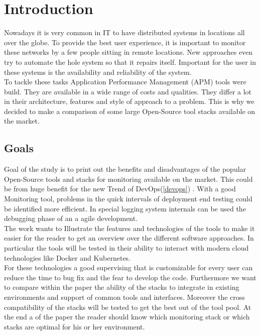 
\chapter{Introduction}
Nowadays it is very common in IT to have distributed systems in locations all over the globe. To provide the best user experience, it is important to monitor these networks by a few people sitting in remote locations. New approaches even try to automate the hole system so that it repairs itself. Important for the user in these systems is the availability and reliability of the system. 
\\
To tackle these tasks Application Performance Management (APM) tools were build. They are available in a wide range of costs and qualities. They differ a lot in their architecture, features and style of approach to a problem. This is why we decided to make a comparison of some large Open-Source tool stacks available on the market. 
\section{Goals}
Goal of the study is to print out the benefits and disadvantages of the popular Open-Source tools and stacks for monitoring available on the market. This could be from huge benefit for the new Trend of DevOps(\cref{devops}) \cite{Bass:2015:DSA:2810087} . With a good Monitoring tool, problems in the quick intervals of deployment end testing could be identified more efficient. In special logging system internals can be used the debugging phase of an a agile development.  
\\ The work wants to Illustrate the features and technologies of the tools to make it easier for the reader to get an overview over the different software approaches. In particular the tools will be tested in their ability to interact with modern cloud technologies like Docker and Kubernetes.\\
For these technologies a good supervising that is customizable for every user can reduce the time to bug fix and the fear to develop the code.
 Furthermore we want to compare within the paper the ability of the stacks to integrate in existing environments and support of common tools and interfaces. Moreover the cross compatibility of the stacks will be tested to get the best out of the tool pool. At the end a of the paper the reader should know which monitoring stack or which stacks are optimal for his or her environment.  

